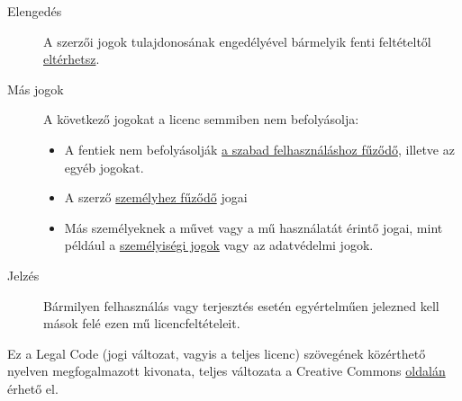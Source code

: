 \documentclass[a4paper, titlepage]{report}
\begin{document}
\begin{description}
 \item[Elengedés] A szerzői jogok tulajdonosának engedélyével bármelyik fenti feltételtől \href{http://creativecommons.org/licenses/by-sa/2.5/hu/#}{eltérhetsz}.
 \item[Más jogok] A következő jogokat a licenc semmiben nem befolyásolja:
 \begin{itemize}
  \item A fentiek nem befolyásolják \href{http://wiki.creativecommons.org/Frequently_Asked_Questions#Do_Creative_Commons_licenses_affect_fair_use.2C_fair_dealing_or_other_exceptions_to_copyright.3F}{a szabad felhasználáshoz fűződő}, illetve az egyéb jogokat.
  \item A szerző \href{http://wiki.creativecommons.org/Frequently_Asked_Questions#I_don.E2.80.99t_like_the_way_a_person_has_used_my_work_in_a_derivative_work_or_included_it_in_a_collective_work.3B_what_can_I_do.3F}{személyhez fűződő} jogai
  \item Más személyeknek a művet vagy a mű használatát érintő jogai, mint például a \href{http://wiki.creativecommons.org/Frequently_Asked_Questions#When_are_publicity_rights_relevant.3F}{személyiségi jogok} vagy az adatvédelmi jogok.
 \end{itemize}
 \item[Jelzés] Bármilyen felhasználás vagy terjesztés esetén egyértelműen jelezned kell mások felé ezen mű licencfeltételeit. 
\end{description}

Ez a Legal Code (jogi változat, vagyis a teljes licenc) szövegének közérthető nyelven megfogalmazott kivonata, teljes változata a Creative Commons \href{http://creativecommons.org/licenses/by-sa/2.5/hu/legalcode}{oldalán} érhető el.

\printindex

\listoftables

\listoffigures

\lstlistoflistings



\end{document}

